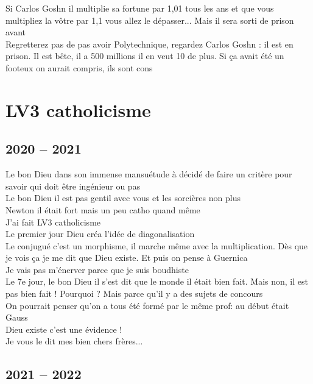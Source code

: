\documentclass[french, a4paper, openany]{book}
\begin{document}
	\noindent \og Si Carlos Goshn il multiplie sa fortune par 1,01 tous les ans et que vous multipliez la vôtre par 1,1 vous allez le dépasser... Mais il sera sorti de prison avant \fg \\
	\og Regretterez pas de pas avoir Polytechnique, regardez Carlos Goshn : il est en prison. Il est bête, il a 500 millions il en veut 10 de plus. Si ça avait été un footeux on aurait compris, ils sont cons \fg \\

\chapter{LV3 catholicisme} 

\section{2020 -- 2021}
 
	\noindent \og Le bon Dieu dans son immense mansuétude à décidé de faire un critère pour savoir qui doit être ingénieur ou pas \fg \\
	\og Le bon Dieu il est pas gentil avec vous et les sorcières non plus \fg \\
	\og Newton il était fort mais un peu catho quand même \fg \\
	\og J'ai fait LV3 catholicisme \fg \\
	\og Le premier jour Dieu créa l'idée de diagonalisation \fg \\
	\og Le conjugué c'est un morphisme, il marche même avec la multiplication. Dès que je vois ça je me dit que Dieu existe. Et puis on pense à Guernica \fg \\
	\og Je vais pas m'énerver parce que je suis boudhiste \fg \\
	\og Le 7e jour, le bon Dieu il s'est dit que le monde il était bien fait. Mais non, il est pas bien fait ! Pourquoi ? Mais parce qu'il y a des sujets de concours \fg \\
	\og On pourrait penser qu'on a tous été formé par le même prof: au début était Gauss \fg \\
	\og Dieu existe c'est une évidence ! \fg \\
	\og Je vous le dit mes bien chers frères... \fg \\

\section{2021 -- 2022}
	
\end{document}
